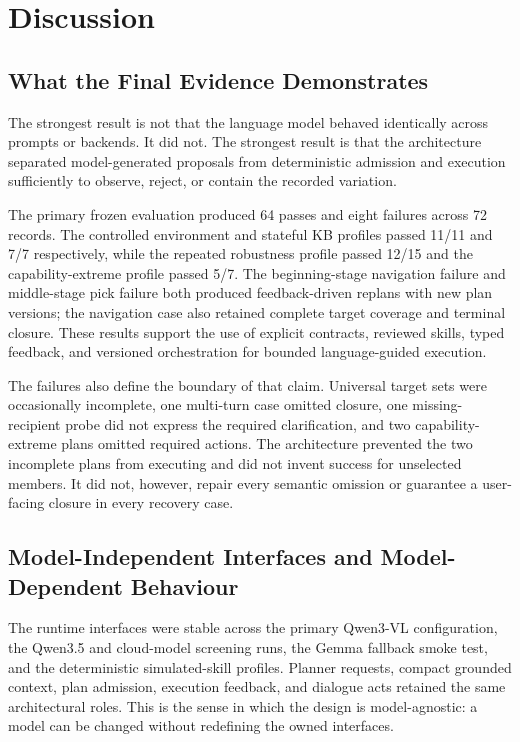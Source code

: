 \chapter{Discussion}
\label{chap:discussion}

\section{What the Final Evidence Demonstrates}

The strongest result is not that the language model behaved identically across prompts or backends. It did not. The strongest result is that the architecture separated model-generated proposals from deterministic admission and execution sufficiently to observe, reject, or contain the recorded variation.

The primary frozen evaluation produced 64 passes and eight failures across 72 records. The controlled environment and stateful KB profiles passed 11/11 and 7/7 respectively, while the repeated robustness profile passed 12/15 and the capability-extreme profile passed 5/7. The beginning-stage navigation failure and middle-stage pick failure both produced feedback-driven replans with new plan versions; the navigation case also retained complete target coverage and terminal closure. These results support the use of explicit contracts, reviewed skills, typed feedback, and versioned orchestration for bounded language-guided execution.

The failures also define the boundary of that claim. Universal target sets were occasionally incomplete, one multi-turn case omitted closure, one missing-recipient probe did not express the required clarification, and two capability-extreme plans omitted required actions. The architecture prevented the two incomplete plans from executing and did not invent success for unselected members. It did not, however, repair every semantic omission or guarantee a user-facing closure in every recovery case.

\section{Model-Independent Interfaces and Model-Dependent Behaviour}

The runtime interfaces were stable across the primary Qwen3-VL configuration, the Qwen3.5 and cloud-model screening runs, the Gemma fallback smoke test, and the deterministic simulated-skill profiles. Planner requests, compact grounded context, plan admission, execution feedback, and dialogue acts retained the same architectural roles. This is the sense in which the design is model-agnostic: a model can be changed without redefining the owned interfaces.

